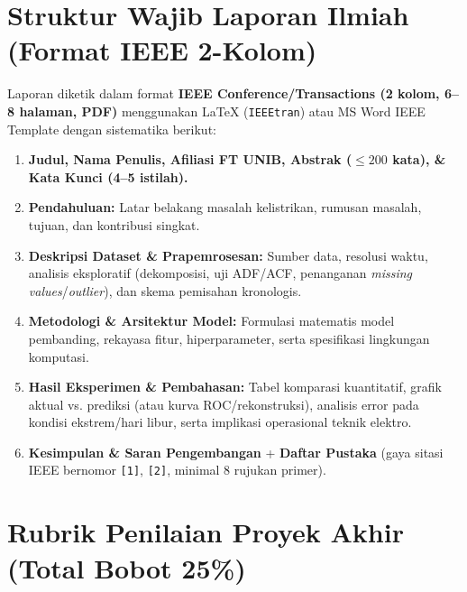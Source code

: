 \documentclass[11pt,a4paper]{article}
\begin{document}
\section{Struktur Wajib Laporan Ilmiah (Format IEEE 2-Kolom)}

Laporan diketik dalam format \textbf{IEEE Conference/Transactions (2 kolom, 6--8 halaman, PDF)} menggunakan LaTeX (\texttt{IEEEtran}) atau MS Word IEEE Template dengan sistematika berikut:
\begin{enumerate}[label=\textbf{\Roman*.}, leftmargin=1.8em, itemsep=2pt]
    \item \textbf{Judul, Nama Penulis, Afiliasi FT UNIB, Abstrak ($\le 200$ kata), \& Kata Kunci (4--5 istilah).}
    \item \textbf{Pendahuluan:} Latar belakang masalah kelistrikan, rumusan masalah, tujuan, dan kontribusi singkat.
    \item \textbf{Deskripsi Dataset \& Prapemrosesan:} Sumber data, resolusi waktu, analisis eksploratif (dekomposisi, uji ADF/ACF, penanganan \textit{missing values}/\textit{outlier}), dan skema pemisahan kronologis.
    \item \textbf{Metodologi \& Arsitektur Model:} Formulasi matematis model pembanding, rekayasa fitur, hiperparameter, serta spesifikasi lingkungan komputasi.
    \item \textbf{Hasil Eksperimen \& Pembahasan:} Tabel komparasi kuantitatif, grafik aktual vs. prediksi (atau kurva ROC/rekonstruksi), analisis error pada kondisi ekstrem/hari libur, serta implikasi operasional teknik elektro.
    \item \textbf{Kesimpulan \& Saran Pengembangan} + \textbf{Daftar Pustaka} (gaya sitasi IEEE bernomor \texttt{[1]}, \texttt{[2]}, minimal 8 rujukan primer).
\end{enumerate}

\section{Rubrik Penilaian Proyek Akhir (Total Bobot 25\%)}
\end{document}
